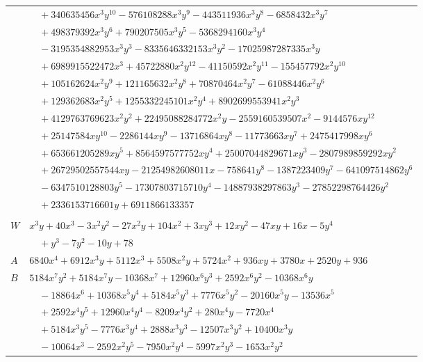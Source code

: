 \documentclass[11pt]{article}
\begin{document}
\begin{longtable}{@{}ll@{}}
 & $\quad +340635456x^{3}y^{10}-576108288x^{3}y^{9}-443511936x^{3}y^{8}-6858432x^{3}y^{7}$\\
 & $\quad +498379392x^{3}y^{6}+790207505x^{3}y^{5}-5368294160x^{3}y^{4}$\\
 & $\quad -3195354882953x^{3}y^{3}-8335646332153x^{3}y^{2}-17025987287335x^{3}y$\\
 & $\quad +6989915522472x^{3}+45722880x^{2}y^{12}-41150592x^{2}y^{11}-155457792x^{2}y^{10}$\\
 & $\quad +105162624x^{2}y^{9}+121165632x^{2}y^{8}+70870464x^{2}y^{7}-61088446x^{2}y^{6}$\\
 & $\quad +129362683x^{2}y^{5}+1255332245101x^{2}y^{4}+8902699553941x^{2}y^{3}$\\
 & $\quad +4129763769623x^{2}y^{2}+22495088284772x^{2}y-2559160539507x^{2}-9144576xy^{12}$\\
 & $\quad +25147584xy^{10}-2286144xy^{9}-13716864xy^{8}-11773663xy^{7}+2475417998xy^{6}$\\
 & $\quad +653661205289xy^{5}+8564597577752xy^{4}+25007044829671xy^{3}-2807989859292xy^{2}$\\
 & $\quad +26729502557544xy-21254982608011x-758641y^{8}-1387223409y^{7}-641097514862y^{6}$\\
 & $\quad -6347510128803y^{5}-17307803715710y^{4}-14887938297863y^{3}-27852298764426y^{2}$\\
 & $\quad +2336153716601y+6911866133357$\\
\addlinespace[3pt]
\multicolumn{2}{@{}l}{$i=11$, $m=36$, neighbours $7,19,24,42,54,83,85,90$}\\
$W$ & $x^{3}y+40x^{3}-3x^{2}y^{2}-27x^{2}y+104x^{2}+3xy^{3}+12xy^{2}-47xy+16x-5y^{4}$\\
 & $\quad +y^{3}-7y^{2}-10y+78$\\
$A$ & $6840x^{4}+6912x^{3}y+5112x^{3}+5508x^{2}y+5724x^{2}+936xy+3780x+2520y+936$\\
$B$ & $5184x^{7}y^{2}+5184x^{7}y-10368x^{7}+12960x^{6}y^{3}+2592x^{6}y^{2}-10368x^{6}y$\\
 & $\quad -18864x^{6}+10368x^{5}y^{4}+5184x^{5}y^{3}+7776x^{5}y^{2}-20160x^{5}y-13536x^{5}$\\
 & $\quad +2592x^{4}y^{5}+12960x^{4}y^{4}-8209x^{4}y^{2}+280x^{4}y-7720x^{4}$\\
 & $\quad +5184x^{3}y^{5}-7776x^{3}y^{4}+2888x^{3}y^{3}-12507x^{3}y^{2}+10400x^{3}y$\\
 & $\quad -10064x^{3}-2592x^{2}y^{5}-7950x^{2}y^{4}-5997x^{2}y^{3}-1653x^{2}y^{2}$\\

\end{longtable}
\end{document}
